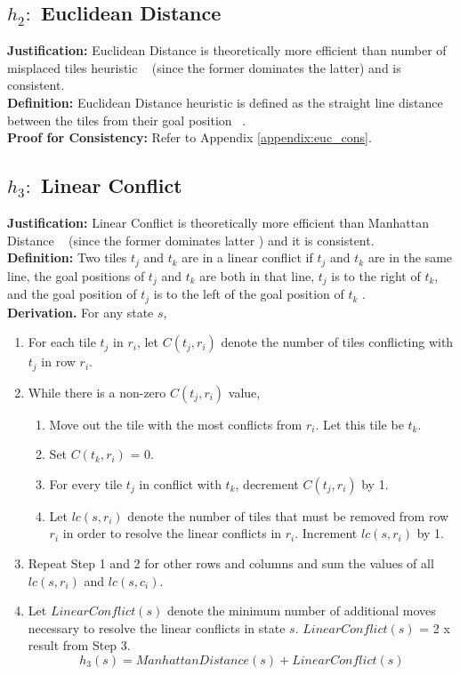 \documentclass[runningheads]{llncs}
\begin{document}
\subsection{\(h_2:\) Euclidean Distance}
\textbf{Justification:} Euclidean Distance is theoretically more efficient than number of misplaced tiles heuristic ~\cite[p104]{stuart_russell_artifical_2010} (since the former dominates the latter) and is consistent. \\
\textbf{Definition:} Euclidean Distance heuristic is defined as the straight line distance between the tiles from their goal position ~\cite{rosalind_euclidean_nodate}. \\
\textbf{Proof for Consistency:} Refer to Appendix \ref{appendix:euc_cons}.

\subsection{ \(h_3: \) Linear Conflict}
\textbf{Justification:} Linear Conflict is theoretically more efficient than Manhattan Distance ~\cite[p104]{stuart_russell_artifical_2010} (since the former dominates latter \cite[p25]{othar_hansson_generating_1985} ) and it is consistent. \\
\textbf{Definition:} Two tiles \( t_j \) and \( t_k \) are in a linear conflict if \( t_j \) and \( t_k \) are in the same line, 
the goal positions of \( t_j \) and \( t_k \) are both in that line, 
\( t_j \) is to the right of \( t_k \), and the goal position of \( t_j \) is to the left of the goal position of \( t_k \) \cite[p13]{othar_hansson_generating_1985}. \\
\textbf{Derivation.} For any state \( s \),
\begin{enumerate}
    \item For each tile \( t_j \) in \( r_i \), let \( C(t_j, r_i) \) denote the number of tiles conflicting with \( t_j \) in row \( r_i \).
    \item While there is a non-zero \( C(t_j, r_i) \) value,
    \begin{enumerate}
        \item Move out the tile with the most conflicts from \( r_i \). Let this tile be \( t_k \).
        \item Set \( C(t_k, r_i) \) = 0.
        \item For every tile \( t_j \) in conflict with \( t_k \), decrement \( C(t_j, r_i) \) by 1.
        \item Let \( lc(s, r_i) \) denote the number of tiles that must be removed from row \( r_i \) in order to resolve the linear conflicts in \( r_i \). Increment \( lc(s, r_i) \) by 1.
    \end{enumerate}
    \item Repeat Step 1 and 2 for other rows and columns and sum the values of all \( lc (s, r_i) \) and \( lc(s, c_i) \).
    \item Let \( LinearConflict(s) \) denote the minimum number of additional moves necessary to resolve the linear conflicts in state \( s \). \( LinearConflict(s) \) = 2 x result from Step 3.
    \[
        h_3(s) = ManhattanDistance(s) + LinearConflict(s)
    \]
\end{enumerate}
\end{document}
